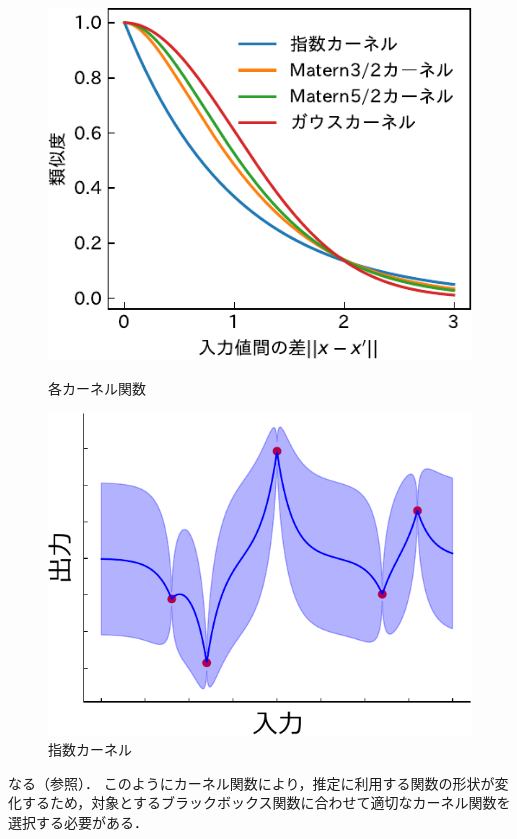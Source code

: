\documentclass[twocolumn]{ltjarticle}
\begin{document}
\begin{figure}[htbp]
	\begin{minipage}[t]{0.5\columnwidth}
		\centering
		\includegraphics[width=\columnwidth]{./figures/kernel-crop.pdf}
		\vspace*{-0.8cm}
		\caption{各カーネル関数} \label{fig:matern_graph}
	\end{minipage}
	\begin{minipage}[t]{0.47\columnwidth}
		\centering
		\includegraphics[width=\columnwidth]{figures/material_8_exp.pdf}
		\vspace*{-0.8cm}
		\caption{指数カーネル} \label{fig:exp_kernel}
	\end{minipage}
\end{figure}
\noindent
なる（参照）．
このようにカーネル関数により，推定に利用する関数の形状が変化するため，対象とするブラックボックス関数に合わせて適切なカーネル関数を選択する必要がある．
\end{document}
